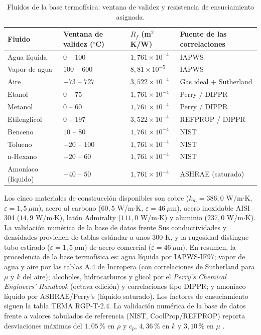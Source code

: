 \documentclass[11pt,a4paper]{article}
\begin{document}
\begin{table}[htbp]
\centering
\caption{Fluidos de la base termof\'isica: ventana de validez y resistencia de
ensuciamiento asignada.}
\label{tab:fluidos}
{\small
\begin{tabular}{@{}llll@{}}
\toprule
\textbf{Fluido} & \textbf{Ventana de validez ($^\circ$C)} &
\textbf{$R_f$ (m$^2$K/W)} & \textbf{Fuente de las correlaciones} \\
\midrule
Agua l\'iquida      & $0$ -- $100$   & $1{,}761 \times 10^{-4}$ & IAPWS \\
Vapor de agua       & $100$ -- $600$ & $8{,}81 \times 10^{-5}$  & IAPWS \\
Aire                & $-73$ -- $727$ & $3{,}522 \times 10^{-4}$ & Gas ideal + Sutherland \\
Etanol              & $0$ -- $75$    & $1{,}761 \times 10^{-4}$ & Perry / DIPPR \\
Metanol             & $0$ -- $60$    & $1{,}761 \times 10^{-4}$ & Perry / DIPPR \\
Etilenglicol        & $0$ -- $197$   & $3{,}522 \times 10^{-4}$ & REFPROP / DIPPR \\
Benceno             & $10$ -- $80$   & $1{,}761 \times 10^{-4}$ & NIST \\
Tolueno             & $-20$ -- $100$ & $1{,}761 \times 10^{-4}$ & NIST \\
n-Hexano            & $-20$ -- $60$  & $1{,}761 \times 10^{-4}$ & NIST \\
Amon\'iaco (l\'iquido) & $-40$ -- $50$ & $1{,}761 \times 10^{-4}$ & ASHRAE (saturado) \\
\bottomrule
\end{tabular}}
\end{table}

Los cinco materiales de construcci\'on disponibles son cobre
($k_m = 386{,}0$ W/m$\cdot$K, $\varepsilon = 1{,}5\ \mu$m), acero al carbono
($60{,}5$ W/m$\cdot$K, $\varepsilon = 46\ \mu$m), acero inoxidable AISI 304
($14{,}9$ W/m$\cdot$K), lat\'on Admiralty ($111{,}0$ W/m$\cdot$K) y aluminio
($237{,}0$ W/m$\cdot$K). La validaci\'on num\'erica de la base de datos frente
Sus conductividades y densidades provienen de tablas est\'andar a unos
$300$ K, y la rugosidad distingue tubo estirado ($\varepsilon = 1{,}5\ \mu$m)
de acero comercial ($\varepsilon = 46\ \mu$m). En resumen, la procedencia de
la base termof\'isica es: agua l\'iquida por IAPWS-IF97\cite{iapws}; vapor de agua y aire
por las tablas A.4 de Incropera\cite{incropera} (con correlaciones de Sutherland para $\mu$ y
$k$ del aire); alcoholes, hidrocarburos y glicol por el
\emph{Perry's Chemical Engineers' Handbook} (octava edici\'on)\cite{perry} y
correlaciones tipo DIPPR; y amon\'iaco l\'iquido por ASHRAE\cite{ashrae}/Perry's
(l\'iquido saturado). Los factores de ensuciamiento siguen la tabla TEMA
RGP-T-2.4. La validaci\'on num\'erica de la base de datos frente a valores
tabulados de referencia (NIST, CoolProp/REFPROP) reporta
desviaciones m\'aximas del $1{,}05\,\%$ en $\rho$ y $c_p$, $4{,}36\,\%$ en $k$
y $3{,}10\,\%$ en $\mu$ \cite{informe}.
\end{document}
